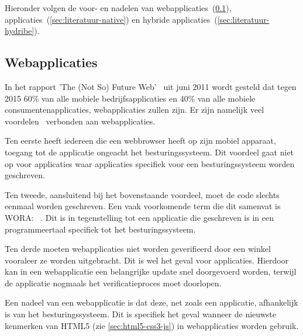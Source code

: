 Hieronder volgen de voor- en nadelen van webapplicaties~(\ref{sec:literatuur-webapps}),  applicaties~(\ref{sec:literatuur-native}) en hybride applicaties~(\ref{sec:literatuur-hydribe}).

\subsection{Webapplicaties}
\label{sec:literatuur-webapps}
In het rapport 'The (Not So) Future Web'~\cite{Phifer2011} uit juni 2011 wordt gesteld dat tegen 2015 60\% van alle mobiele bedrijfsapplicaties en 40\% van alle mobiele consumentenapplicaties, webapplicaties zullen zijn. 
Er zijn namelijk veel voordelen~\cite{Accenture2012} verbonden aan webapplicaties.

Ten eerste heeft iedereen die een webbrowser heeft op zijn mobiel apparaat, toegang tot de applicatie ongeacht het besturingssysteem.
Dit voordeel gaat niet op voor  applicaties waar applicaties specifiek voor een besturingssysteem worden geschreven.

Ten tweede, aansluitend bij het bovenstaande voordeel, moet de code slechts eenmaal worden geschreven. 
Een vaak voorkomende term die dit samenvat is WORA: ~\cite{Hales2012}. 
Dit is in tegenstelling tot een  applicatie die geschreven is in een programmeertaal specifiek tot het besturingssysteem. 

Ten derde moeten webapplicaties niet worden geverifieerd door een winkel vooraleer ze worden uitgebracht. 
Dit is wel het geval voor  applicaties. 
Hierdoor kan in een webapplicatie een belangrijke update snel doorgevoerd worden, terwijl de  applicatie nogmaals het verificatieproces moet doorlopen.

Een nadeel van een webapplicatie is dat deze, net zoals een  applicatie, afhankelijk is van het besturingssysteem.
Dit is specifiek het geval wanneer de nieuwste kenmerken van HTML5 (zie \ref{sec:html5-css3-js}) in webapplicaties worden gebruik.

